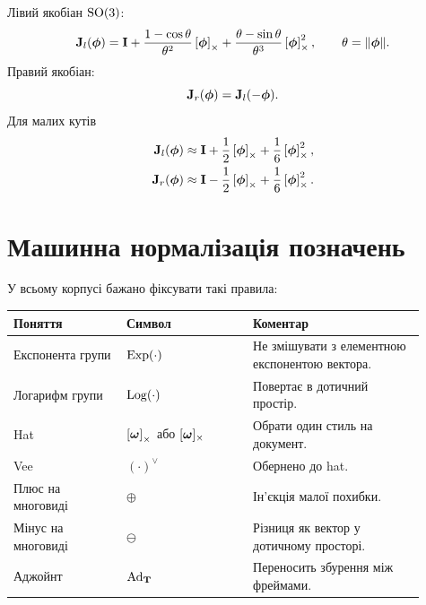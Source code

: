 Лівий якобіан $\mathrm{SO}(3)$:
\begin{equation}\label{eq:left_jac_SO3_session02}
\mathbf{J}_l(\bm{\phi})
=\mathbf{I}
+\frac{1-\cos\theta}{\theta^2}\left[\bm{\phi}\right]_{\times}
+\frac{\theta-\sin\theta}{\theta^3}\left[\bm{\phi}\right]_{\times}^2,
\qquad \theta=\|\bm{\phi}\|.
\end{equation}
Правий якобіан:
\begin{equation}
\mathbf{J}_r(\bm{\phi})=\mathbf{J}_l(-\bm{\phi}).
\end{equation}
Для малих кутів
\begin{align}
\mathbf{J}_l(\bm{\phi})&\approx \mathbf{I}+\frac12\left[\bm{\phi}\right]_{\times}+\frac16\left[\bm{\phi}\right]_{\times}^2,\\
\mathbf{J}_r(\bm{\phi})&\approx \mathbf{I}-\frac12\left[\bm{\phi}\right]_{\times}+\frac16\left[\bm{\phi}\right]_{\times}^2.
\end{align}

\section{Машинна нормалізація позначень}

У всьому корпусі бажано фіксувати такі правила:
\begin{longtable}{L{0.25\linewidth}L{0.28\linewidth}L{0.38\linewidth}}
\toprule
Поняття & Символ & Коментар\\
\midrule
Експонента групи & $\operatorname{Exp}(\cdot)$ & Не змішувати з елементною експонентою вектора.\\
Логарифм групи & $\operatorname{Log}(\cdot)$ & Повертає в дотичний простір.\\
Hat & $\left[\bm{\omega}\right]_{\times}$ або $[\bm{\omega}]_\times$ & Обрати один стиль на документ.\\
Vee & $(\cdot)^\vee$ & Обернено до hat.\\
Плюс на многовиді & $\oplus$ & Ін'єкція малої похибки.\\
Мінус на многовиді & $\ominus$ & Різниця як вектор у дотичному просторі.\\
Аджойнт & $\operatorname{Ad}_{\mathbf{T}}$ & Переносить збурення між фреймами.\\
\bottomrule
\end{longtable}
